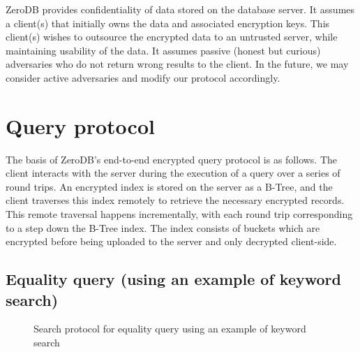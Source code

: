 \documentclass[notitlepage,longbibliography]{revtex4-1}
\begin{document}
ZeroDB provides confidentiality of data stored on the database server.
It assumes a client(s) that initially owns the data and associated encryption keys.
This client(s) wishes to outsource the encrypted data to an untrusted server, while maintaining usability of the data.
It assumes passive (honest but curious) adversaries who do not return wrong results to the client.
In the future, we may consider active adversaries and modify our protocol accordingly.



\section{Query protocol}
\label{sec:query-protocol}

The basis of ZeroDB's end-to-end encrypted query protocol is as follows.
The client interacts with the server during the execution of a query over a series of round trips.
An encrypted index is stored on the server as a B-Tree, and the client traverses this index remotely to retrieve the necessary encrypted records.
This remote traversal happens incrementally, with each round trip corresponding to a step down the B-Tree index.
The index consists of buckets which are encrypted before being uploaded to the server and only decrypted client-side.

\subsection{Equality query (using an example of keyword search)}
\begin{figure}
	\begin{center}
        \qquad
	\end{center}
    \caption{Search protocol for equality query using an example of keyword search}
	\label{fig:btree-protocol}
\end{figure}
\end{document}
